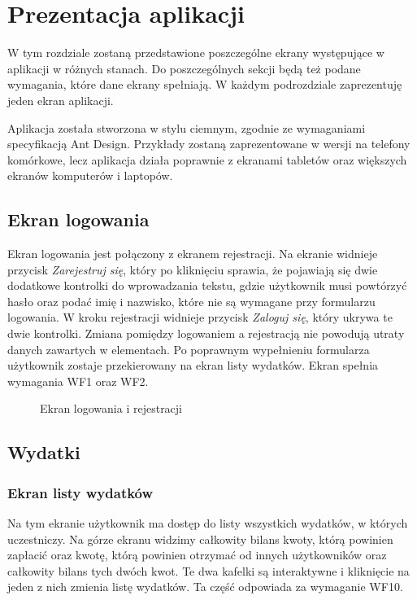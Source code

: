 \newpage
\section{Prezentacja aplikacji}
W tym rozdziale zostaną przedstawione poszczególne ekrany występujące w aplikacji w różnych stanach. Do poszczególnych sekcji będą też podane wymagania, które dane ekrany spełniają. W każdym podrozdziale zaprezentuję jeden ekran aplikacji.


Aplikacja została stworzona w stylu ciemnym, zgodnie ze wymaganiami specyfikacją Ant Design. Przykłady zostaną zaprezentowane w wersji na telefony komórkowe, lecz aplikacja działa poprawnie z ekranami tabletów oraz większych ekranów komputerów i laptopów.

\clearpage
\subsection{Ekran logowania}
Ekran logowania jest połączony z ekranem rejestracji. Na ekranie widnieje przycisk \emph{Zarejestruj się}, który po kliknięciu sprawia, że pojawiają się dwie dodatkowe kontrolki do wprowadzania tekstu, gdzie użytkownik musi powtórzyć hasło oraz podać imię i nazwisko, które nie są wymagane przy formularzu logowania. W kroku rejestracji widnieje przycisk \emph{Zaloguj się}, który ukrywa te dwie kontrolki. Zmiana pomiędzy logowaniem a rejestracją nie powodują utraty danych zawartych w elementach. Po poprawnym wypełnieniu formularza użytkownik zostaje przekierowany na ekran listy wydatków. Ekran spełnia wymagania WF1 oraz WF2.


\begin{figure}[h!]%
    \centering
    \qquad
    \caption{Ekran logowania i rejestracji}%
\end{figure}

\clearpage
\subsection{Wydatki}
\subsubsection{Ekran listy wydatków}
Na tym ekranie użytkownik ma dostęp do listy wszystkich wydatków, w których uczestniczy. Na górze ekranu widzimy całkowity bilans kwoty, którą powinien zapłacić oraz kwotę, którą powinien otrzymać od innych użytkowników oraz całkowity bilans tych dwóch kwot. Te dwa kafelki są interaktywne i kliknięcie na jeden z nich zmienia listę wydatków. Ta część odpowiada za wymaganie WF10.

